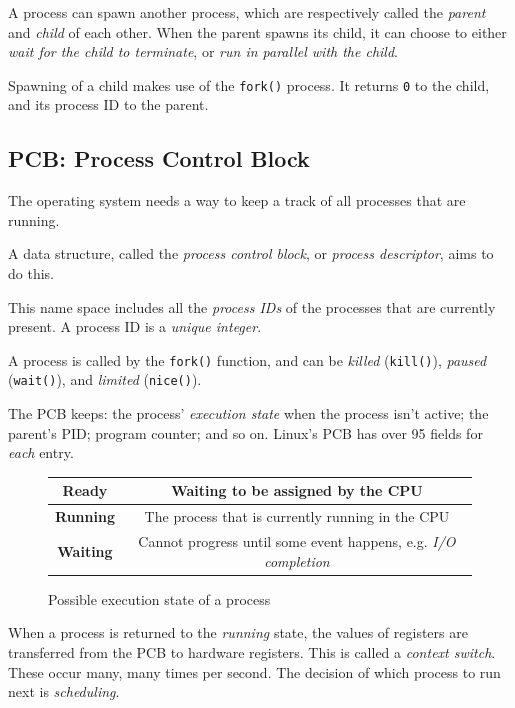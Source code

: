 \documentclass[a4]{article}
\begin{document}
A process can spawn another process, which are respectively called the \textit{parent} and \textit{child} of each other. When the parent spawns its child, it can choose to either \textit{wait for the child to terminate}, or \textit{run in parallel with the child}.

Spawning of a child makes use of the \texttt{fork()} process. It returns \texttt{0} to the child, and its process ID to the parent.

\subsection{PCB: Process Control Block}

The operating system needs a way to keep a track of all processes that are running.

A data structure, called the \textit{process control block}, or \textit{process descriptor}, aims to do this.

This name space includes all the \textit{process IDs} of the processes that are currently present. A process ID is a \textit{unique integer}.

A process is called by the \texttt{fork()} function, and can be \textit{killed} (\texttt{kill()}), \textit{paused} (\texttt{wait()}), and \textit{limited} (\texttt{nice()}).

The PCB keeps: the process' \textit{execution state} when the process isn't active; the parent's PID; program counter; and so on. Linux's PCB has over 95 fields for \textit{each} entry.

\begin{figure}[H]
  \begin{center}
    \begin{tabular}{|c|c|}
      \hline
      \textbf{Ready} & Waiting to be assigned by the CPU\\
      \hline
      \textbf{Running} & The process that is currently running in the CPU\\
      \hline
      \textbf{Waiting} & Cannot progress until some event happens, e.g. \textit{I/O completion}\\
      \hline
    \end{tabular}
    \caption{Possible execution state of a process}
  \end{center}
\end{figure}

When a process is returned to the \textit{running} state, the values of registers are transferred from the PCB to hardware registers. This is called a \textit{context switch}. These occur many, many times per second. The decision of which process to run next is \textit{scheduling}.
\end{document}
